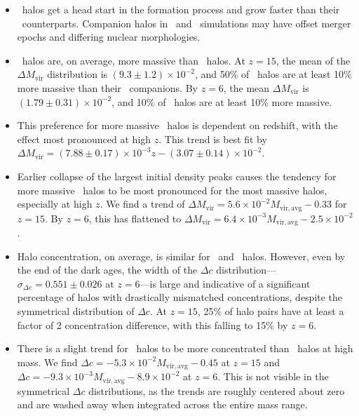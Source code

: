 \begin{itemize}
	\item  \lpt\ halos get a head start in the formation process and grow faster than their \za\ counterparts.  Companion halos in \lpt\ and \za\ simulations may have offset merger epochs and differing nuclear morphologies.
	\item  \lpt\ halos are, on average, more massive than \za\ halos.  At $z = 15$, the mean of the $\Delta M_{\mathrm{vir}}$ distribution is $(9.3 \pm 1.2) \times 10^{-2}$, and 50\% of \lpt\ halos are at least 10\% more massive than their \za\ companions.  By $z = 6$, the mean $\Delta M_{\mathrm{vir}}$ is $(1.79 \pm 0.31) \times 10^{-2}$, and 10\% of \lpt\ halos are at least 10\% more massive.
	\item  This preference for more massive \lpt\ halos is dependent on redshift, with the effect most pronounced at high $z$.  This trend is best fit by $\Delta M_{\mathrm{vir}} = (7.88 \pm 0.17) \times 10^{-3} z - (3.07 \pm 0.14) \times 10^{-2}$.
	\item  Earlier collapse of the largest initial density peaks causes the tendency for more massive \lpt\ halos to be most pronounced for the most massive halos, especially at high $z$. We find a trend of $\Delta M_{\mathrm{vir}} = 5.6 \times 10^{-2} M_{\mathrm{vir,avg}} - 0.33$ for $z = 15$.  By $z = 6$, this has flattened to $\Delta M_{\mathrm{vir}} = 6.4 \times 10^{-3} M_{\mathrm{vir,avg}} - 2.5 \times 10^{-2}$.
	\item  Halo concentration, on average, is similar for \lpt\ and \za\ halos.  However, even by the end of the dark ages, the width of the $\Delta c$ distribution---$\sigma_{\Delta c} = 0.551 \pm 0.026$ at $z = 6$---is large and indicative of a significant percentage of halos with drastically mismatched concentrations, despite the symmetrical distribution of $\Delta c$.  At $z = 15$, 25\% of halo pairs have at least a factor of 2 concentration difference, with this falling to 15\% by $z = 6$.
	\item  There is a slight trend for \za\ halos to be more concentrated than \lpt\ halos at high mass.  We find $\Delta c = -5.3 \times 10^{-2} M_{\mathrm{vir,avg}} - 0.45$ at $z = 15$ and $\Delta c = -9.3 \times 10^{-3} M_{\mathrm{vir,avg}} - 8.9 \times 10^{-2}$ at $z = 6$.  This is not visible in the symmetrical $\Delta c$ distributions, as the trends are roughly centered about zero and are washed away when integrated across the entire mass range.
\end{itemize}




